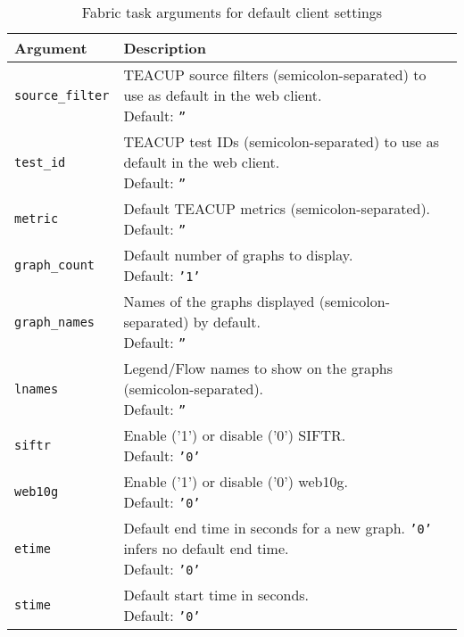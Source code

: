 \documentclass[a4paper,twocolumn,english,11pt, a4paper, conference]{IEEEtran}
\begin{document}
\begin{table}[t]
	\centering
	\caption{Fabric task arguments for default client settings}
	\label{table:defaults}
	\small
	\begin{tabular}{l  l}	
		\textbf{Argument} & \textbf{Description} \\ \toprule
		\texttt{source\_filter}&  \pbox{5.5cm}{TEACUP source filters (semicolon-separated) to use as default in the web client.  \\ Default: \texttt{''}} \\ \midrule 
		\texttt{test\_id}      &  \pbox{5.5cm}{ TEACUP test IDs (semicolon-separated) to use as default in the web client.  \\ Default: \texttt{''}} \\ \midrule 
		\texttt{metric}        & \pbox{5.5cm}{Default TEACUP metrics (semicolon-separated). \\ Default: \texttt{''}} \\ \midrule 
		\texttt{graph\_count} &  \pbox{5.5cm}{Default number of graphs to display. \\ Default: \texttt{'1'} } \\ \midrule 
		\texttt{graph\_names}  &  \pbox{5.5cm}{ Names of the graphs displayed (semicolon-separated) by default.  \\ Default: \texttt{''}} \\ \midrule 
		\texttt{lnames}        &  \pbox{5.5cm}{Legend/Flow names to show on the graphs (semicolon-separated).  \\ Default: \texttt{''}} \\ \midrule 
		\texttt{siftr}         & \pbox{5.5cm}{ Enable ('1') or disable ('0') SIFTR.  \\ Default: \texttt{'0'}} \\ \midrule 
		\texttt{web10g}        & \pbox{5.5cm}{Enable ('1') or disable ('0') web10g.  \\ Default: \texttt{'0'}} \\ \midrule 
		\texttt{etime}         & \pbox{5.5cm}{ Default end time in seconds for a new graph. \texttt{'0'} infers no default end time.  \\ Default: \texttt{'0'}} \\ \midrule 
		\texttt{stime}         & \pbox{5.5cm}{ Default start time in seconds. \\ Default: \texttt{'0'}} \\ \bottomrule
	\end{tabular}
\end{table}
\end{document}

